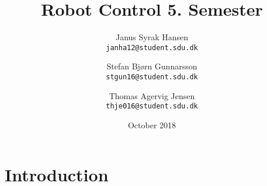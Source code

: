 \documentclass{article}
\title{Robot Control 5. Semester}
\author{
  Janus Syrak Hansen\\
  \texttt{janha12@student.sdu.dk}
  \and
  Stefan Bjørn Gunnarsson\\
  \texttt{stgun16@student.sdu.dk}
  \and
  Thomas Agervig Jensen\\
  \texttt{thje016@student.sdu.dk}
}
\date{October 2018}
\begin{document}
\maketitle

\section{Introduction}
\end{document}
